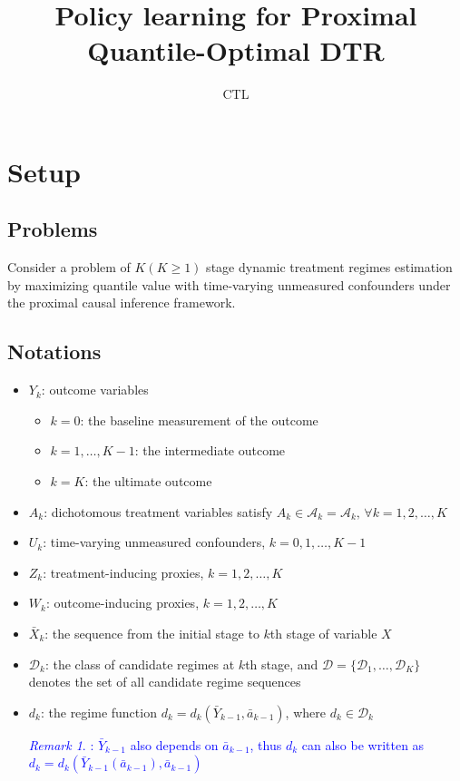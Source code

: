 \documentclass[10pt]{article}
\title{Policy learning for Proximal Quantile-Optimal DTR}
\author{CTL}
\date{}
\theoremstyle{remark} \newtheorem{rem}{Remark}
\begin{document}
\maketitle
\section{Setup}
\subsection{Problems}
Consider a problem of $K(K\geq1)$ stage dynamic treatment regimes estimation by maximizing quantile value with time-varying unmeasured confounders under the proximal causal inference framework.

\subsection{Notations}
\begin{itemize}
    \item $Y_k$: outcome variables
        \begin{itemize}
            \item $k=0$: the baseline measurement of the outcome
            \item $k=1,\ldots,K-1$: the intermediate outcome
            \item $k=K$: the ultimate outcome
        \end{itemize}
    \item $A_k$: dichotomous treatment variables satisfy $A_k \in \mathcal{A}_k=\mathcal{A}_k, \, \forall k=1,2,\ldots,K$
    \item $U_k$: time-varying unmeasured confounders, $k=0,1,\ldots,K-1$
    \item $Z_k$: treatment-inducing proxies, $k=1,2,\ldots,K$
    \item $W_k$: outcome-inducing proxies, $k=1,2,\ldots,K$
    \item $\bar{X}_k$: the sequence from the initial stage to $k$th stage of variable $X$
    \item $\mathcal{D}_k$: the class of candidate regimes at $k$th stage, and $\mathcal{D} =\{\mathcal{D}_1,\ldots, \mathcal{D}_K\}$ denotes the set of all candidate regime sequences
    \item $d_k$: the regime function $d_k=d_k(\bar{Y}_{k-1},\bar{a}_{k-1})$, where $d_k \in \mathcal{D}_k$ 
    \textcolor{blue}{\begin{rem}: $\bar{Y}_{k-1}$ also depends on $\bar{a}_{k-1}$, thus $d_k$ can also be written as $d_k=d_k(\bar{Y}_{k-1}(\bar{a}_{k-1}),\bar{a}_{k-1})$\end{rem}}
\end{itemize}
\end{document}

